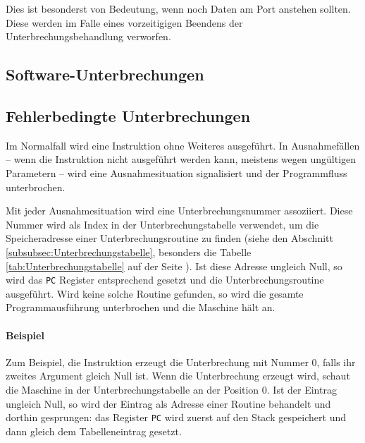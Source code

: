 Dies ist besonderst von Bedeutung, wenn noch Daten am Port anstehen sollten.
Diese werden im Falle eines vorzeitigigen Beendens der Unterbrechungsbehandlung
verworfen.

\subsection{Software-Unterbrechungen}



\subsection{Fehlerbedingte Unterbrechungen}

Im Normalfall wird eine Instruktion ohne Weiteres ausgeführt. In Ausnahmefällen
-- wenn die Instruktion nicht ausgeführt werden kann, meistens wegen ungültigen
Parametern -- wird eine Ausnahmesituation signalisiert
und der Programmfluss unterbrochen.


Mit jeder Ausnahmesituation wird eine Unterbrechungsnummer assoziiert. Diese
Nummer wird als Index in der Unterbrechungstabelle verwendet, um die
Speicheradresse einer Unterbrechungsroutine zu finden (siehe den Abschnitt
\ref{subsubsec:Unterbrechungstabelle}, besonders die Tabelle
\ref{tab:Unterbrechungstabelle} auf der Seite
\pageref{tab:Unterbrechungstabelle}). Ist diese Adresse ungleich Null, so wird
das \texttt{PC} Register entsprechend gesetzt und die Unterbrechungsroutine
ausgeführt. Wird keine solche Routine gefunden, so wird die gesamte
Programmausführung unterbrochen und die Maschine hält an.


\paragraph{Beispiel}
Zum Beispiel, die  Instruktion erzeugt die Unterbrechung mit Nummer
0, falls ihr zweites Argument gleich Null ist. Wenn die Unterbrechung erzeugt
wird, schaut die Maschine in der Unterbrechungstabelle an der Position 0. Ist
der Eintrag ungleich Null, so wird der Eintrag als Adresse einer Routine
behandelt und dorthin gesprungen: das Register \texttt{PC} wird
zuerst auf den Stack gespeichert und dann gleich dem Tabelleneintrag gesetzt.

